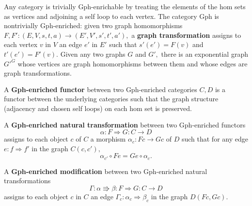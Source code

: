 \documentclass[submission,copyright,creativecommons]{eptcs}
\newcommand{\maps}{\colon}
\begin{document}
Any category is trivially Gph-enrichable by treating the elements of the hom sets as vertices and adjoining a self loop to each vertex.  The category Gph is nontrivially Gph-enriched: given two graph homomorphisms $F, F'\maps (E, V, s, t, a) \to (E', V', s', t', a'),$ a {\bf graph transformation} assigns to each vertex $v$ in $V$ an edge $e'$ in $E'$ such that $s'(e') = F(v)$ and $t'(e') = F'(v).$  Given any two graphs $G$ and $G',$ there is an exponential graph $G'^G$ whose vertices are graph homomorphisms between them and whose edges are graph transformations.

A {\bf Gph-enriched functor} between two Gph-enriched categories $C, D$ is a functor between the underlying categories such that the graph structure (adjacency and chosen self loops) on each hom set is preserved.  

A {\bf Gph-enriched natural transformation} between two Gph-enriched functors 
\[\alpha\maps F \Rightarrow G\maps C \to D\]
assigns to each object $c$ of $C$ a morphism $\alpha_c\maps Fc \to Gc$ of $D$ such that for any edge $e\maps f \Rightarrow f'$ in the graph $C(c,c'),$
\[\alpha_{c'}\circ Fe = Ge \circ \alpha_c.\]

A {\bf Gph-enriched modification} between two Gph-enriched natural transformations
\[\Gamma\maps \alpha \Rrightarrow \beta\maps F\Rightarrow G\maps C\to D\]
assigns to each object $c$ in $C$ an edge $\Gamma_c\maps \alpha_c \Rightarrow \beta_c$ in the graph $D(Fc, Gc).$
\end{document}
